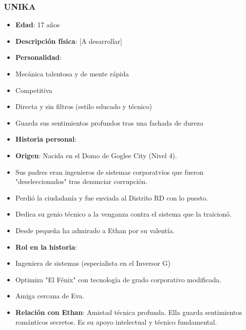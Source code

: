 \documentclass[11pt,a4paper]{report}
\begin{document}
\subsubsection{UNIKA}
\begin{itemize}
  \item \textbf{Edad}: 17 años
  \item \textbf{Descripción física}: [A desarrollar]
  \item \textbf{Personalidad}: 
  \item Mecánica talentosa y de mente rápida
  \item Competitiva
  \item Directa y sin filtros (estilo educado y técnico)
  \item Guarda sus sentimientos profundos tras una fachada de dureza
  \item \textbf{Historia personal}:
  \item \textbf{Origen}: Nacida en el Domo de Goglee City (Nivel 4).
  \item Sus padres eran ingenieros de sistemas corporatvios que fueron "deseleccionados" tras denunciar corrupción.
  \item Perdió la ciudadanía y fue enviada al Distrito RD con lo puesto.
  \item Dedica su genio técnico a la venganza contra el sistema que la traicionó.
  \item Desde pequeña ha admirado a Ethan por su valentía.
  \item \textbf{Rol en la historia}: 
  \item Ingeniera de sistemas (especialista en el Inversor G)
  \item Optimiza "El Fénix" con tecnología de grado corporativo modificada.
  \item Amiga cercana de Eva.
  \item \textbf{Relación con Ethan}: Amistad técnica profunda. Ella guarda sentimientos románticos secretos. Es su apoyo intelectual y técnico fundamental.

\end{itemize}
\end{document}
